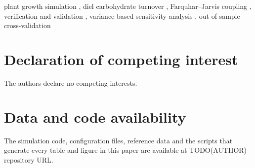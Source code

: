 \documentclass[a4paper,fleqn]{cas-sc}
\begin{document}
\begin{keywords}
plant growth simulation \sep
diel carbohydrate turnover \sep
Farquhar--Jarvis coupling \sep
verification and validation \sep
variance-based sensitivity analysis \sep
out-of-sample cross-validation
\end{keywords}

\maketitle







\section*{Declaration of competing interest}
The authors declare no competing interests.

\section*{Data and code availability}
The simulation code, configuration files, reference data and the scripts that
generate every table and figure in this paper are available at
TODO(AUTHOR) repository URL.



\end{document}
